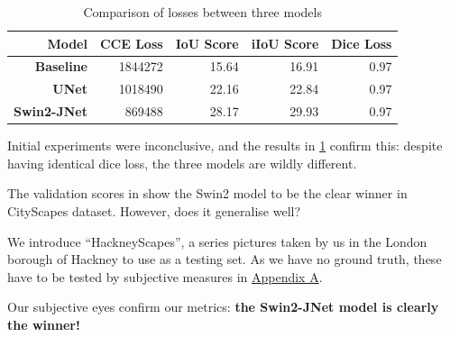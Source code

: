 \begin{table}[h]
	\centering
	\footnotesize
	\begin{tabular}{>{\bfseries}r | r r r r}
		\toprule
		Model & CCE Loss & IoU Score & iIoU Score & Dice Loss \\
		\midrule
		Baseline & \num{1844272} & 15.64 & 16.91 & 0.97 \\
		UNet & \num{1018490} & 22.16 & 22.84 & 0.97 \\
		Swin2-JNet & \num{869488} & 28.17 & 29.93 & 0.97 \\
		\bottomrule
	\end{tabular}
	\caption{Comparison of losses between three models}
	\label{result_scores}
\end{table}

Initial experiments were inconclusive, and the results in \cref{result_scores} confirm this: despite having identical dice loss, the three models are wildly different.

The validation scores in \label{result_scores} show the Swin2 model to be the clear winner in CityScapes dataset.
However, does it generalise well?

We introduce ``HackneyScapes'', a series pictures taken by us in the London borough of Hackney to use as a testing set.
As we have no ground truth, these have to be tested by subjective measures in \hyperref[hackneyscapes]{Appendix A}.

Our subjective eyes confirm our metrics: \textbf{the Swin2-JNet model is clearly the winner!}
